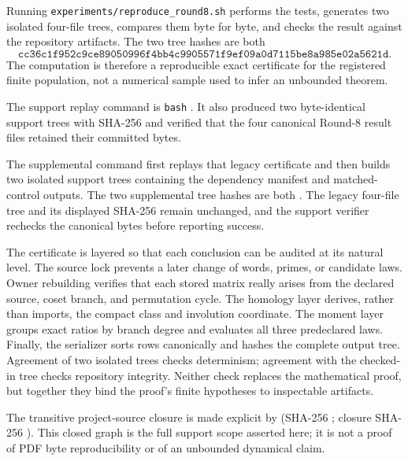 \documentclass[11pt]{article}
\theoremstyle{definition}
\theoremstyle{remark}
\begin{document}
Running \texttt{experiments/reproduce\_round8.sh} performs the tests, generates two isolated four-file trees, compares them byte for byte, and checks the result against the repository artifacts. The two tree hashes are both
\[
\texttt{cc36c1f952c9ce89050996f4bb4c9905571f9ef09a0d7115be8a985e02a5621d}.
\]
The computation is therefore a reproducible exact certificate for the registered finite population, not a numerical sample used to infer an unbounded theorem.

The support replay command is \texttt{bash} . It also produced two byte-identical support trees with SHA-256  and verified that the four canonical Round-8 result files retained their committed bytes.

The supplemental command
first replays that legacy certificate and then builds two isolated support trees containing the dependency manifest and matched-control outputs. The two supplemental tree hashes are both
.
The legacy four-file tree and its displayed SHA-256 remain unchanged, and the support verifier rechecks the canonical bytes before reporting success.

The certificate is layered so that each conclusion can be audited at its natural level. The source lock prevents a later change of words, primes, or candidate laws. Owner rebuilding verifies that each stored matrix really arises from the declared source, coset branch, and permutation cycle. The homology layer derives, rather than imports, the compact class and involution coordinate. The moment layer groups exact ratios by branch degree and evaluates all three predeclared laws. Finally, the serializer sorts rows canonically and hashes the complete output tree. Agreement of two isolated trees checks determinism; agreement with the checked-in tree checks repository integrity. Neither check replaces the mathematical proof, but together they bind the proof's finite hypotheses to inspectable artifacts.

The transitive project-source closure is made explicit by  (SHA-256 ; closure SHA-256 ). This closed graph is the full support scope asserted here; it is not a proof of PDF byte reproducibility or of an unbounded dynamical claim.
\end{document}
